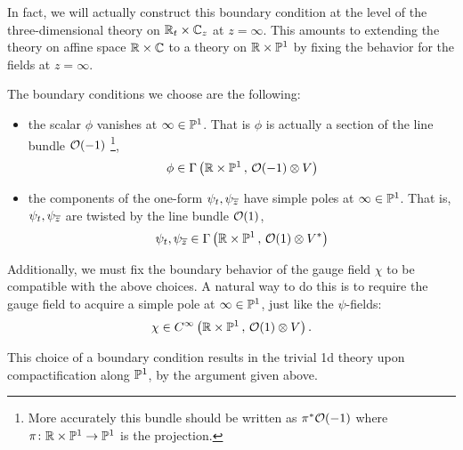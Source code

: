 \documentclass[11pt]{amsart}
\def\brian#1{{\textcolor{blue!65!red}{BRW: {#1}}}}
\begin{document}
In fact, we will actually construct this boundary condition at the level of the three-dimensional theory on $\mathbb R_t \times \mathbb C_z$ at $z = \infty$. 
This amounts to extending the theory on affine space $\mathbb R \times \mathbb C$ to a theory on $\mathbb R \times \mathbb P^1$ by fixing the behavior for the fields at $z = \infty$. 

The boundary conditions we choose are the following:
\begin{itemize}
\item the scalar $\phi$ vanishes at $\infty \in \mathbb P^1$. 
That is $\phi$ is actually a section of the line bundle $\mathcal O(-1)$ \footnote{More accurately this bundle should be written as $\pi^* \mathcal O(-1)$ where $\pi \colon \mathbb R \times \mathbb P^1 \to \mathbb P^1$ is the projection.}, 
\[
\phi \in \Gamma \left(\mathbb R \times \mathbb P^1 \, , \, \mathcal O(-1) \otimes V \right) 
\]
\item the components of the one-form $\psi_{t}, \psi_{{\overline{z}}}$ have simple poles at $\infty \in \mathbb P^1$.
That is, $\psi_t,\psi_{{\overline{z}}}$ are twisted by the line bundle $\mathcal O(1)$,
\[
\psi_{t}, \psi_{{\overline{z}}}\in \Gamma\left(\mathbb R \times \mathbb P^1 \, , \, \mathcal O(1) \otimes V^*\right)
\]
\end{itemize}

Additionally, we must fix the boundary behavior of the gauge field $\chi$ to be compatible with the above choices.
A natural way to do this is to require the gauge field to acquire a simple pole at $\infty \in \mathbb P^1$, just like the $\psi$-fields:
\[
\chi \in C^\infty\left(\mathbb R \times \mathbb P^1 \, , \, \mathcal O(1) \otimes V\right) .
\]

This choice of a boundary condition results in the trivial 1d theory upon compactification along $\mathbb P^1$, by the argument given above. 

%
%
%
\end{document}
